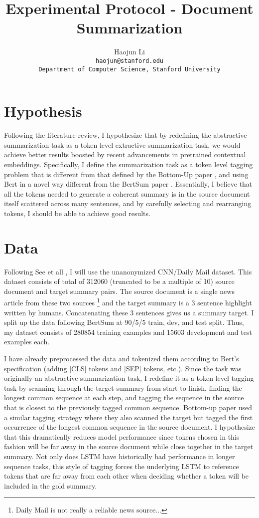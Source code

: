 \documentclass[11pt,a4paper]{article}
\title{Experimental Protocol - Document Summarization}
\author{Haojun Li \\
  \texttt{haojun@stanford.edu}\\
  \texttt{Department of Computer Science, Stanford University}
}
\date{}
\begin{document}
\maketitle
\section{Hypothesis}
Following the literature review, I hypothesize that by redefining the abstractive summarization task as a token level extractive summarization task, we would achieve better results boosted by recent advancements in pretrained contextual embeddings. Specifically, I define the summarization task as a token level tagging problem that is different from that defined by the Bottom-Up paper \cite{bottom-up}, and using Bert in a novel way different from the BertSum paper \cite{bert-sum}. Essentially, I believe that all the tokens needed to generate a coherent summary is in the source document itself scattered across many sentences, and by carefully selecting and rearranging tokens, I should be able to achieve good results.

\section{Data}
Following See et all \cite{pointer-generator}, I will use the unanonymized CNN/Daily Mail dataset. This dataset consists of total of 312060 (truncated to be a multiple of 10) source document and target summary pairs. The source document is a single news article from these two sources \footnote{Daily Mail is not really a reliable news source...} and the target summary is a 3 sentence highlight written by humans. Concatenating these 3 sentences gives us a summary target. I split up the data following BertSum \cite{bert-sum} at 90/5/5 train, dev, and test split. Thus, my dataset consists of 280854 training examples and 15603 development and test examples each. 

I have already preprocessed the data and tokenized them according to Bert's specification (adding [CLS] tokens and [SEP] tokens, etc.). Since the task was originally an abstractive summarization task, I redefine it as a token level tagging task by scanning through the target summary from start to finish, finding the longest common sequence at each step, and tagging the sequence in the source that is closest to the previously tagged common sequence. Bottom-up paper \cite{bottom-up} used a similar tagging strategy where they also scanned the target but tagged the first occurrence of the longest common sequence in the source document. I hypothesize that this dramatically reduces model performance since tokens chosen in this fashion will be far away in the source document while close together in the target summary. Not only does LSTM have historically bad performance in longer sequence tasks, this style of tagging forces the underlying LSTM to reference tokens that are far away from each other when deciding whether a token will be included in the gold summary.
\end{document}
